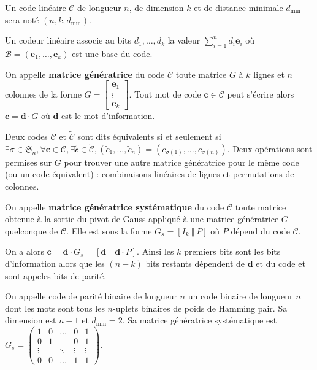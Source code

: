 	\begin{note}
		Un code linéaire $\mathcal{C}$ de longueur $n$, de dimension $k$ et de distance minimale $d_{\min}$ sera noté $(n,k,d_{\min})$.
	\end{note}

	\begin{defn}
		Un codeur linéaire associe au bits $d_1,\ldots,d_k$ la valeur $\sum_{i = 1}^n d_i \mathbf{e}_i$ où $\mathcal{B} = (\mathbf{e}_1,\ldots,\mathbf{e}_k)$ est une base du code.
	\end{defn}

	\begin{defn}
		On appelle \textbf{matrice génératrice} du code $\mathcal{C}$ toute matrice $G$ à $k$ lignes et $n$ colonnes de la forme
		$G = \begin{bmatrix}
			\mathbf{e}_1 \\ \vdots \\ \mathbf{e}_k
			\end{bmatrix}$.
		Tout mot de code $\mathbf{c} \in \mathcal{C}$ peut s'écrire alors $\mathbf{c} = \mathbf{d} \cdot G$ où $\mathbf{d}$ est le mot d'information.
	\end{defn}

	Deux codes $\mathcal{C}$ et $\mathcal{\tilde{C}}$ sont dits équivalents si et seulement si
	$\exists \sigma \in \mathfrak{S}_n,
		\forall \mathbf{c} \in \mathcal{C},
		\exists \mathcal{\tilde{c}} \in \mathcal{\tilde{C}},
		(\tilde{c}_1,\ldots,\tilde{c}_n) = (c_{\sigma(1)},\ldots,c_{\sigma(n)})$.
	Deux opérations sont permises sur $G$ pour trouver une autre matrice génératrice pour le même code (ou un code équivalent) : combinaisons linéaires de lignes et permutations de colonnes.

	\begin{defn}
		On appelle \textbf{matrice génératrice systématique} du code $\mathcal{C}$ toute matrice obtenue à la sortie du pivot de Gauss appliqué à une matrice génératrice $G$ quelconque de $\mathcal{C}$.
		Elle est sous la forme $G_s = [ I_k \ \Vert \ P]$ où $P$ dépend du code $\mathcal{C}$.
	\end{defn}

	On a alors $\mathbf{c} = \mathbf{d} \cdot G_s = [\mathbf{d} \quad \mathbf{d} \cdot P]$.
	Ainsi les $k$ premiers bits sont les bits d'information alors que les $(n - k)$ bits restants dépendent de $\mathbf{d}$ et du code et sont appeles bits de parité.

	\begin{ex}
		On appelle code de parité binaire de longueur $n$ un code binaire de longueur $n$ dont les mots sont tous les $n$-uplets binaires de poids de Hamming pair.
		Sa dimension est $n - 1$ et $d_{\min} = 2$.
		Sa matrice génératrice systématique est $G_s = \left( \begin{smallmatrix}
			1	   & 0 & \ldots & 0	  & 1 \\
			0	   & 1 &		    & 0	  & 1 \\
			\vdots &   & \ddots & \vdots & \vdots \\
			0	   & 0 & \ldots & 1	  & 1
			\end{smallmatrix} \right)$.
	\end{ex}

